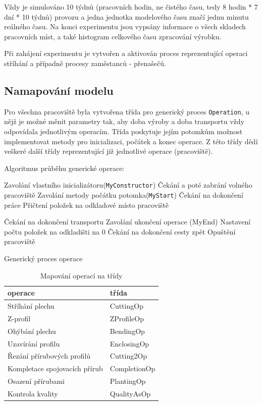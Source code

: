 \documentclass[11pt, a4paper]{article}
\begin{document}
Vždy je simulováno 10 týdnů (pracovních hodin, ne čistého času, tedy 8 hodin * 7 dní * 10 týdnů) provozu a jedna jednotka modelového času značí jednu minutu reálného času. Na konci experimentu jsou vypsány informace o všech skladech\cite[str. 184]{ims} pracovních míst, a také histogram\cite[str. 81]{ims} celkového času zpracování výrobku.

Při zahájení experimentu je vytvořen a aktivován proces\cite[str. 171]{ims} reprezentující operaci stříhání\cite[str. 46]{bp} a případně procesy zaměstanců - přenašečů.
\newpage
\subsection{Namapování modelu}
Pro všechna pracoviště byla vytvořena třída pro generický proces \verb|Operation|, u nějž je možné měnit parametry tak, aby doba výroby a doba transportu vždy odpovídala jednotlivým operacím. Třída poskytuje jejím potomkům možnost implementovat metody pro inicializaci, počátek a konec operace. Z této třídy dědí veškeré další třídy reprezentující již jednotlivé operace (pracoviště).

Algoritmus průběhu generické operace:
\begin{algorithm}[ht]
        Zavolání vlastního inicializátoru(\texttt{MyConstructor})\;
        Čekání a poté zabrání volného pracoviště\;
        Zavolání metody počátku potomka(\texttt{MyStart})\;
        Čekání na dokončení práce\;
        Přičtení položek na odkladové místo pracoviště\;
		
		{
			Čekání na dokončení transportu\;
			{
			    Zavolání ukončení operace (MyEnd)\;
			}
			Nastavení počtu položek na odkladišti na 0\;
			Čekání na dokončení cesty zpět\;
		}{}
		Opuštění pracoviště\;
	

		\caption{Generický proces operace}
		\label{algorithm:workshift}
	\end{algorithm}
\begin{table}[H]
    \centering
    \begin{tabular}{|l|l|}
     \hline \textbf{operace} &  \textbf{třída}\\ \hline
Stříhání plechu   & CuttingOp\\ \hline
Z-profil    &  ZProfileOp\\ \hline
Ohýbání plechu    & BendingOp\\ \hline
Uzavírání profilu    & EnclosingOp\\  \hline
Řezání přírubových profilů    & Cutting2Op\\ \hline
Kompletace spojovacích přírub& CompletionOp\\ \hline
Osazení přírubami    & PlantingOp \\
    \hline
Kontrola kvality    &QualityAsOp \\
    \hline


    \end{tabular}
    \caption{Mapování operací na třídy}
    \label{rgrg}
\end{table}
\end{document}
